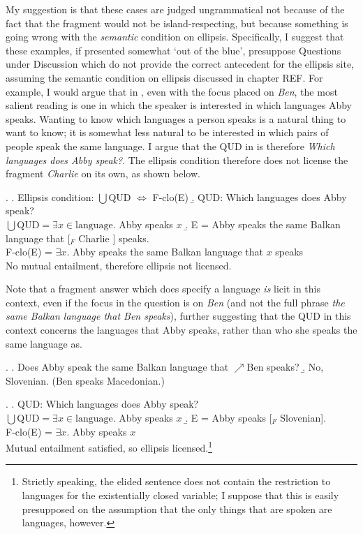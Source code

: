 \documentclass[11pt,letterpaper]{article}
\newcommand{\pred}[1]{\ensuremath{\mathrm{{#1}}}}
\begin{document}
My suggestion is that these cases are judged ungrammatical not because of the fact that the fragment would not be island-respecting, but because something is going wrong with the \emph{semantic} condition on ellipsis. Specifically, I suggest that these examples, if presented somewhat `out of the blue', presuppose Questions under Discussion which do not provide the correct antecedent for the ellipsis site, assuming the semantic condition on ellipsis discussed in chapter REF. %
For example, I would argue that in \LLast, even with the focus placed on \textit{Ben}, the most salient reading is one in which the speaker is interested in which languages Abby speaks. Wanting to know which languages a person speaks is a natural thing to want to know; it is somewhat less natural to be interested in which pairs of people speak the same language. I argue that the QUD in \LLast is therefore {\it Which languages does Abby speak?}. The ellipsis condition therefore does not license the fragment {\it Charlie} on its own, as shown below.

\ex. 	\a. Ellipsis condition: $\bigcup$QUD $\Leftrightarrow$ F-clo(E)
	\b. QUD: Which languages does Abby speak?\\
	    $\bigcup$QUD$= \exists x \in \pred{language}. $ Abby speaks $x$
	\b. E = Abby speaks the same Balkan language that [$_F$ Charlie ] speaks.\\
	    F-clo(E) = $\exists x. $ Abby speaks the same Balkan language that $x$ speaks\\
	    No mutual entailment, therefore ellipsis not licensed.
	    
Note that a fragment answer which does specify a language \emph{is} licit in this context, even if the focus in the question is on {\it Ben} (and not the full phrase {\it the same Balkan language that Ben speaks}), further suggesting that the QUD in this context concerns the languages that Abby speaks, rather than who she speaks the same language as.

\ex. 	\a. Does Abby speak the same Balkan language that $\nearrow$Ben speaks?
	\b. No, Slovenian. (Ben speaks Macedonian.) %
	
\ex. 	\a. QUD: Which languages does Abby speak?\\
	    $\bigcup$QUD$= \exists x \in \pred{language}. $ Abby speaks $x$
	\b. E = Abby speaks [$_F$ Slovenian].\\
	    F-clo(E) = $\exists x. $ Abby speaks $x$\\
	    Mutual entailment satisfied, so ellipsis licensed.\footnote{Strictly speaking, the elided sentence does not contain the restriction to languages for the existentially closed variable; I suppose that this is easily presupposed on the assumption that the only things that are spoken are languages, however.}
	    
\end{document}
